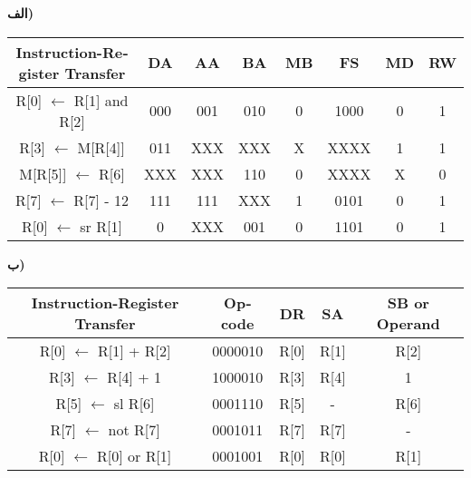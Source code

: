 
\noindent
\textbf{الف)}
\begin{latin}
\begin{center}
\begin{tabular}{|c|c|c|c|c|c|c|c|}
    \hline
    Instruction-Register Transfer & DA & AA & BA & MB & FS & MD & RW\\
    \hline
    R[0] $\leftarrow$ R[1] and R[2] & 000 & 001 & 010 & 0 & 1000 & 0 & 1\\
    \hline
    R[3] $\leftarrow$ M[R[4]] & 011 & XXX & XXX & X & XXXX & 1 & 1\\
    \hline
    M[R[5]] $\leftarrow$ R[6] & XXX & XXX & 110 & 0 & XXXX & X & 0\\
    \hline
    R[7] $\leftarrow$ R[7] - 12 & 111 & 111 & XXX & 1 & 0101 & 0 & 1\\
    \hline
    R[0] $\leftarrow$ sr R[1] & 0 & XXX & 001 & 0 & 1101 & 0 & 1\\
    \hline
\end{tabular}
\end{center}
\end{latin}

\noindent
\textbf{ب)}
\begin{latin}
\begin{center}
\begin{tabular}{|c|c|c|c|c|}
    \hline
    Instruction-Register Transfer & Opcode & DR & SA & SB or Operand\\
    \hline
    R[0] $\leftarrow$ R[1] + R[2] & 0000010 & R[0] & R[1] & R[2]\\
    \hline
    R[3] $\leftarrow$ R[4] + 1 & 1000010 & R[3] & R[4] & 1\\
    \hline
    R[5] $\leftarrow$ sl R[6] & 0001110 & R[5] & - & R[6]\\
    \hline
    R[7] $\leftarrow$ not R[7] & 0001011 & R[7] & R[7] & -\\
    \hline
    R[0] $\leftarrow$ R[0] or R[1] & 0001001 & R[0] & R[0] & R[1]\\
    \hline
\end{tabular}
\end{center}
\end{latin}